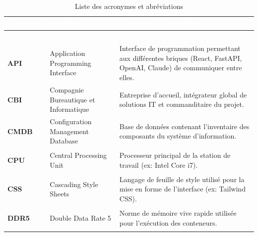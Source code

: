 \documentclass[12pt, a4paper]{report}
\begin{document}
\begin{longtable}{|p{2.5cm}|p{5.5cm}|p{\dimexpr\textwidth-8.8cm}|}
    \hline
    \rowcolor{ChapColor}
    \textcolor{white}{\textbf{Acronyme}} & \textcolor{white}{\textbf{Signification}} & \textcolor{white}{\textbf{Contexte / Description}} \\ \hline
    \endfirsthead

    \hline
    \rowcolor{ChapColor}
    \textcolor{white}{\textbf{Acronyme}} & \textcolor{white}{\textbf{Signification}} & \textcolor{white}{\textbf{Contexte / Description}} \\ \hline
    \endhead

    \hline
    \endfoot

    \hline
    \caption{Liste des acronymes et abréviations}
    \label{tab:acronymes}
    \endlastfoot

    \hypertarget{acr:1}{}\textbf{API} & Application Programming Interface & Interface de programmation permettant aux différentes briques (React, FastAPI, OpenAI, Claude) de communiquer entre elles. \\ \hline
    
    \hypertarget{acr:2}{}\textbf{CBI} & Compagnie Bureautique et Informatique & Entreprise d'accueil, intégrateur global de solutions IT et commanditaire du projet. \\ \hline
    
    \hypertarget{acr:3}{}\textbf{CMDB} & Configuration Management Database & Base de données contenant l'inventaire des composants du système d'information. \\ \hline
    
    \hypertarget{acr:4}{}\textbf{CPU} & Central Processing Unit & Processeur principal de la station de travail (ex: Intel Core i7). \\ \hline
    
    \hypertarget{acr:5}{}\textbf{CSS} & Cascading Style Sheets & Langage de feuille de style utilisé pour la mise en forme de l'interface (ex: Tailwind CSS). \\ \hline
    
    \hypertarget{acr:6}{}\textbf{DDR5} & Double Data Rate 5 & Norme de mémoire vive rapide utilisée pour l'exécution des conteneurs. \\ \hline
    

\end{longtable}
\end{document}
